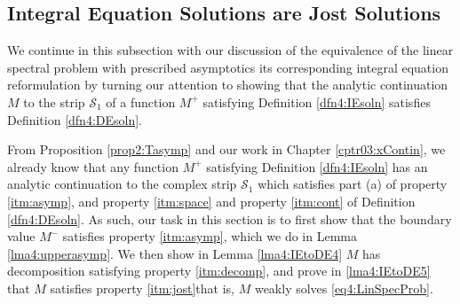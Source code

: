 \documentclass[../dissertation.tex]{subfiles}
\begin{document}
\subsection{Integral Equation Solutions are Jost Solutions}\label{subsec4:IEtoDE}

We continue in this subsection with our discussion of the equivalence of 
the linear spectral problem with prescribed asymptotics its corresponding
integral equation reformulation by turning our attention to showing 
that the analytic continuation $M$ to the strip $\mathcal S_1$ of a 
function $M^+$ satisfying 
Definition \ref{dfn4:IEsoln} satisfies Definition \ref{dfn4:DEsoln}.

From Proposition \ref{prop2:Tasymp} and our work in Chapter \ref{cptr03:xContin},
we already know that any function $M^+$ satisfying Definition \ref{dfn4:IEsoln}
has an analytic continuation to the complex strip $\mathcal S_1$ which
satisfies part (a) of property \ref{itm:asymp}, and property \ref{itm:space} 
and property \ref{itm:cont} of Definition \ref{dfn4:DEsoln}. As such, our task in this 
section is to first show that 
the boundary value $M^-$ satisfies property \ref{itm:asymp}, which
we do in Lemma \ref{lma4:upperasymp}. We then show in Lemma \ref{lma4:IEtoDE4}
$M$ has decomposition satisfying property \ref{itm:decomp}, and prove 
in \ref{lma4:IEtoDE5} that $M$ satisfies property \ref{itm:jost}\textemdash{}that is,
$M$ weakly solves \eqref{eq4:LinSpecProb}.
\end{document}
